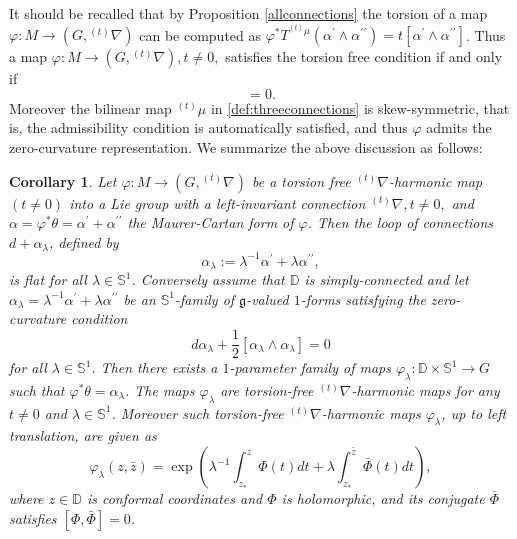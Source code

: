 \documentclass[12pt]{amsart}
\newtheorem{Corollary}[Theorem]{Corollary}
\theoremstyle{definition}
\theoremstyle{remark}
\numberwithin{equation}{section}
\begin{document}
 It should be recalled that 
 by Proposition \ref{allconnections}
 the torsion of a map $\varphi:M\to (G,{{}^{(t)} \nabla})$ can be computed as 
 $\varphi^{*}T^{{}^{(t)}\mu}(\alpha^{\prime} \wedge \alpha^{\prime \prime}) 
 = t [\alpha^{\prime}\wedge \alpha^{\prime\prime}]$.
 Thus a map $\varphi:M\to (G,{{}^{(t)} \nabla}),  t\neq 0,$ satisfies the torsion free condition if 
 and only if 
\begin{equation*}
 [\alpha^{\prime}\wedge \alpha^{\prime\prime}] =0.
\end{equation*}
 Moreover the bilinear map 
 ${}^{(t)}\mu$ in \eqref{def:threeconnections} is skew-symmetric, that is, the admissibility condition is
 automatically satisfied, and thus $\varphi$ admits the zero-curvature representation.
 We summarize the above discussion as follows:
\begin{Corollary}\label{coro:torsion-freeharmonicity}
 Let $\varphi:M\to (G, {{}^{(t)} \nabla})$ be a 
 torsion free ${{}^{(t)} \nabla}$-harmonic map $(t \neq 0)$ into a Lie group with
 a left-invariant connection ${{}^{(t)} \nabla}, t \neq 0,$ and 
 $\alpha = \varphi^{*}\theta  = \alpha^{\prime} + 
 \alpha^{\prime \prime}$ the Maurer-Cartan form of $\varphi$.
 Then the loop of connections $d+\alpha_{\lambda}$, defined by
\begin{equation}\label{eq:alpha-familystrong2}
 \alpha_{\lambda}:= \lambda^{-1}\alpha^{\prime} 
 +\lambda \alpha^{\prime\prime},
\end{equation}
 is flat for all $\lambda \in \mathbb S^1$. 
 Conversely assume that  $\mathbb{D}$ is simply-connected and 
 let $\alpha_{\lambda}= \lambda^{-1}\alpha^{\prime}+ \lambda
 \alpha^{\prime \prime}$ be an $\mathbb{S}^1$-family of 
 $\mathfrak{g}$-valued $1$-forms satisfying 
 the zero-curvature condition
\begin{equation*}
 d\alpha_{\lambda}+\frac{1}{2}[\alpha_\lambda\wedge \alpha_\lambda]=0
\end{equation*}
 for all $\lambda \in \mathbb{S}^1$.
 Then there exists a $1$-parameter family of maps $\varphi_\lambda:
 \mathbb{D}\times \mathbb{S}^1\to G$
 such that  $\varphi^{*}\theta= \alpha_{\lambda}$. 
 The maps $\varphi_{\lambda}$ are torsion-free ${{}^{(t)} \nabla}$-harmonic maps 
 for any $t \neq 0$ and $\lambda \in \mathbb S^1$. 
 Moreover such torsion-free ${{}^{(t)} \nabla}$-harmonic maps $\varphi_{\lambda}$, 
 up to left translation, are given as 
\begin{equation*}
 \varphi_{\lambda}(z, \bar z) = 
 \exp\left(\lambda^{-1} \int_{z_*}^z\varPhi(t) dt +\lambda \int_{z_*}^{\bar z} \bar{\varPhi}(t) dt\right),
\end{equation*}
 where $z \in {\mathbb D}$ is conformal coordinates and 
 $\varPhi$ is holomorphic, and its conjugate $\bar \varPhi$ satisfies
 $[\varPhi, \bar \varPhi] =0$.
\end{Corollary}
\end{document}

